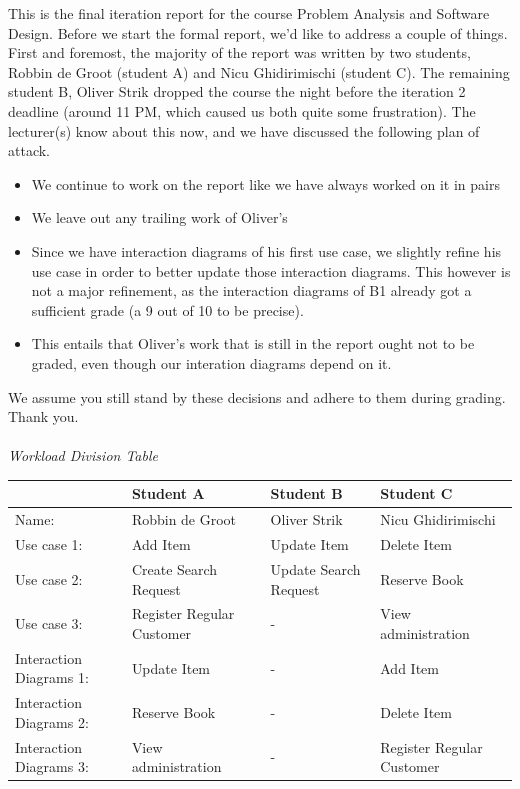 This is the final iteration report for the course Problem Analysis and Software Design. Before we start the formal report, we'd like to address a couple of things.
First and foremost, the majority of the report was written by two students, Robbin de Groot (student A) and Nicu Ghidirimischi (student C). The remaining student B, Oliver Strik dropped the course the night before the iteration 2 deadline (around 11 PM, which caused us both quite some frustration). The lecturer(s) know about this now, and we have discussed the following plan of attack.
\begin{itemize}
	\item We continue to work on the report like we have always worked on it in pairs
	\item We leave out any trailing work of Oliver's
	\item Since we have interaction diagrams of his first use case, we slightly refine his use case in order to better update those interaction diagrams. This however is not a major refinement, as the interaction diagrams of B1 already got a sufficient grade (a 9 out of 10 to be precise).
	\item This entails that Oliver's work that is still in the report ought not to be graded, even though our interation diagrams depend on it.
\end{itemize}
We assume you still stand by these decisions and adhere to them during grading. Thank you.\\\\
\textsl{Workload Division Table}
\begin{center}\begin{tabular}{|l|l|l|l|}
\hline
 & Student A & Student B & Student C\\\hline
 Name: & Robbin de Groot & Oliver Strik & Nicu Ghidirimischi\\\hline
 Use case 1:& Add Item & Update Item & Delete Item\\\hline
 Use case 2:& Create Search Request & Update Search Request & Reserve Book\\\hline
 Use case 3:& Register Regular Customer & - & View administration  \\\hline
 Interaction Diagrams 1:& Update Item& - & Add Item\\\hline
 Interaction Diagrams 2:& Reserve Book & - & Delete Item\\\hline
 Interaction Diagrams 3:& View administration & - & Register Regular Customer \\\hline
 \end{tabular}\end{center}
